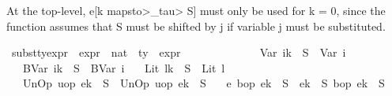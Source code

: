 \begin{isabellebody}
\begin{isamarkuptext}%
At the top-level, e[k \<mapsto>_\<tau> S] must only be used for k = 0, since the function assumes that
S must be shifted by j if variable j must be substituted.%
\end{isamarkuptext}\isamarkuptrue%
\isamarkupfalse%
\ subst{\isacharunderscore}{\kern0pt}ty{\isacharunderscore}{\kern0pt}expr\ {\isacharcolon}{\kern0pt}{\isacharcolon}{\kern0pt}\ {\isachardoublequoteopen}expr\ {\isasymRightarrow}\ nat\ {\isasymRightarrow}\ ty\ {\isasymRightarrow}\ expr{\isachardoublequoteclose}\ {\isacharparenleft}{\kern0pt}{\isachardoublequoteopen}{\isacharunderscore}{\kern0pt}{\isacharbrackleft}{\kern0pt}{\isacharunderscore}{\kern0pt}\ {\isasymmapsto}\isactrlsub {\isasymtau}\ {\isacharunderscore}{\kern0pt}{\isacharbrackright}{\kern0pt}{\isachardoublequoteclose}\ {\isacharbrackleft}{\kern0pt}{}{}{}{\isacharcomma}{\kern0pt}\ {}{\isacharcomma}{\kern0pt}\ {}{\isacharbrackright}{\kern0pt}\ {}{}{}{\isacharparenright}{\kern0pt}\isanewline
\ \ \isanewline
\ \ \ \ {\isachardoublequoteopen}{\isacharparenleft}{\kern0pt}Var\ i{\isacharparenright}{\kern0pt}{\isacharbrackleft}{\kern0pt}k\ {\isasymmapsto}\isactrlsub {\isasymtau}\ S{\isacharbrackright}{\kern0pt}\ {\isacharequal}{\kern0pt}\ Var\ i{\isachardoublequoteclose}\isanewline
\ \ {\isacharbar}{\kern0pt}\ {\isachardoublequoteopen}{\isacharparenleft}{\kern0pt}BVar\ i{\isacharparenright}{\kern0pt}{\isacharbrackleft}{\kern0pt}k\ {\isasymmapsto}\isactrlsub {\isasymtau}\ S{\isacharbrackright}{\kern0pt}\ {\isacharequal}{\kern0pt}\ BVar\ i{\isachardoublequoteclose}\isanewline
\ \ {\isacharbar}{\kern0pt}\ {\isachardoublequoteopen}{\isacharparenleft}{\kern0pt}Lit\ l{\isacharparenright}{\kern0pt}{\isacharbrackleft}{\kern0pt}k\ {\isasymmapsto}\isactrlsub {\isasymtau}\ S{\isacharbrackright}{\kern0pt}\ {\isacharequal}{\kern0pt}\ {\isacharparenleft}{\kern0pt}Lit\ l{\isacharparenright}{\kern0pt}{\isachardoublequoteclose}\isanewline
\ \ {\isacharbar}{\kern0pt}\ {\isachardoublequoteopen}{\isacharparenleft}{\kern0pt}UnOp\ uop\ e{\isacharparenright}{\kern0pt}{\isacharbrackleft}{\kern0pt}k\ {\isasymmapsto}\isactrlsub {\isasymtau}\ S{\isacharbrackright}{\kern0pt}\ {\isacharequal}{\kern0pt}\ UnOp\ uop\ {\isacharparenleft}{\kern0pt}e{\isacharbrackleft}{\kern0pt}k\ {\isasymmapsto}\isactrlsub {\isasymtau}\ S{\isacharbrackright}{\kern0pt}{\isacharparenright}{\kern0pt}{\isachardoublequoteclose}\isanewline
\ \ {\isacharbar}{\kern0pt}\ {\isachardoublequoteopen}{\isacharparenleft}{\kern0pt}e{}\ {\isasymguillemotleft}bop{\isasymguillemotright}\ e{}{\isacharparenright}{\kern0pt}{\isacharbrackleft}{\kern0pt}k\ {\isasymmapsto}\isactrlsub {\isasymtau}\ S{\isacharbrackright}{\kern0pt}\ {\isacharequal}{\kern0pt}\ {\isacharparenleft}{\kern0pt}e{}{\isacharbrackleft}{\kern0pt}k\ {\isasymmapsto}\isactrlsub {\isasymtau}\ S{\isacharbrackright}{\kern0pt}{\isacharparenright}{\kern0pt}\ {\isasymguillemotleft}bop{\isasymguillemotright}\ {\isacharparenleft}{\kern0pt}e{}{\isacharbrackleft}{\kern0pt}k\ {\isasymmapsto}\isactrlsub {\isasymtau}\ S{\isacharbrackright}{\kern0pt}{\isacharparenright}{\kern0pt}{\isachardoublequoteclose}\isanewline

\end{isabellebody}
